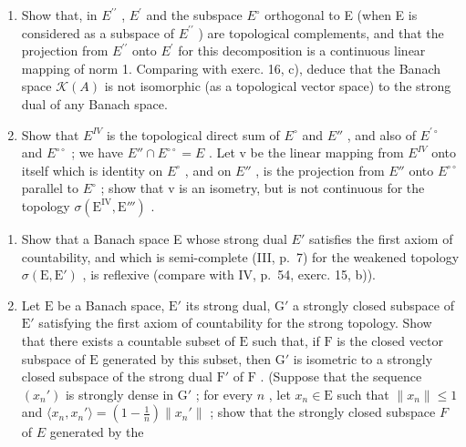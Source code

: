 \begin{enumerate}
\def\labelenumi{\alph{enumi})}
\item
  Show that, in \(E^{\prime\prime}\) , \(E^{\prime}\) and the subspace \(E^{\circ}\) orthogonal to E (when E is considered as a subspace of \(E^{\prime\prime}\) ) are topological complements, and that the projection from \(E^{\prime\prime}\) onto \(E^{\prime}\) for this decomposition is a continuous linear mapping of norm 1. Comparing with exerc. 16, c), deduce that the Banach space \(\mathcal{K}(A)\) is not isomorphic (as a topological vector space) to the strong dual of any Banach space.
\item
  Show that \(E^{IV}\) is the topological direct sum of \(E^{\circ}\) and \(E''\) , and also of \(E^{\prime\circ}\) and \(E^{\circ\circ}\) ; we have \(E'' \cap E^{\circ\circ} = E\) . Let v be the linear mapping from \(E^{IV}\) onto itself which is identity on \(E^{\circ}\) , and on \(E''\) , is the projection from \(E''\) onto \(E^{\circ\circ}\) parallel to \(E^{\circ}\) ; show that v is an isometry, but is not continuous for the topology \(\sigma(\mathrm{E}^{\mathrm{IV}}, \mathrm{E}''')\) .
\end{enumerate}

\begin{enumerate}
\def\labelenumi{\arabic{enumi})}
\setcounter{enumi}{17}
\item
  Show that a Banach space E whose strong dual \(E'\) satisfies the first axiom of countability, and which is semi-complete (III, p.~7) for the weakened topology \(\sigma(\mathrm{E}, \mathrm{E}')\) , is reflexive (compare with IV, p.~54, exerc. 15, b)).
\item
  Let \(\mathrm{E}\) be a Banach space, \(\mathrm{E}'\) its strong dual, \(\mathrm{G}'\) a strongly closed subspace of \(\mathrm{E}'\) satisfying the first axiom of countability for the strong topology. Show that there exists a countable subset of \(\mathrm{E}\) such that, if \(\mathrm{F}\) is the closed vector subspace of \(\mathrm{E}\) generated by this subset, then \(\mathrm{G}'\) is isometric to a strongly closed subspace of the strong dual \(\mathrm{F}'\) of \(\mathrm{F}\) . (Suppose that the sequence \((x_n')\) is strongly dense in \(\mathrm{G}'\) ; for every \(n\) , let \(x_n \in \mathrm{E}\) such that \(\| x_n \| \leqslant 1\) and \(\langle x_n, x_n' \rangle = \left(1 - \frac{1}{n}\right) \| x_n' \|\) ; show that the strongly closed subspace \(F\) of \(E\) generated by the
\end{enumerate}


